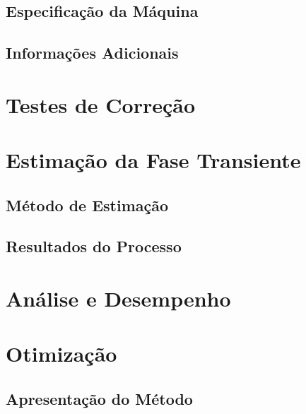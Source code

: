 \documentclass[a4paper,12pt]{report}
\begin{document}
\section{Especificação da Máquina}

\section{Informações Adicionais}

\chapter{Testes de Correção}

\chapter{Estimação da Fase Transiente}

\section{Método de Estimação}

\section{Resultados do Processo}

\chapter{Análise e Desempenho}





\chapter{Otimização}

\section{Apresentação do Método}
\end{document}
